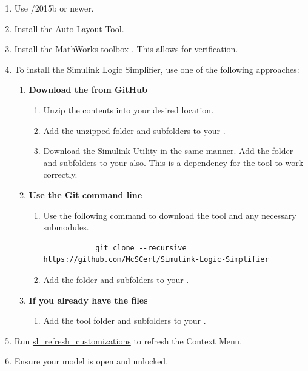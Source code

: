 \documentclass{article}
\makeatletter
\newcommand{\ToolName}{Simulink Logic Simplifier\@\xspace}
\makeatother
\begin{document}
\begin{enumerate}
	\item Use \Matlab/\Simulink 2015b or newer.
	\item Install the \href{https://github.com/McSCert/Auto-Layout}{Auto Layout Tool}.
	\item Install the MathWorks toolbox \href{https://www.mathworks.com/products/sldesignverifier.html}{\SDV}. This allows for verification.
	\item To install the \ToolName, use one of the following approaches:
	\begin{enumerate}
		\item \textbf{Download the  from GitHub}
		\begin{enumerate} 
			\item Unzip the contents into your desired location. 
			\item Add the unzipped folder and subfolders to your \mpath. 
			\item Download the \href{https://github.com/McSCert/Simulink-Utility}{Simulink-Utility} in the same manner. Add the folder and subfolders to your \mpath also. This is a dependency for the tool to work correctly.
		\end{enumerate}
		\item \textbf{Use the Git command line}
		\begin{enumerate}
			\item Use the following command to download the tool and any necessary submodules. 
			\begin{verbatim}
			git clone --recursive https://github.com/McSCert/Simulink-Logic-Simplifier
			\end{verbatim}
			\item Add the folder and subfolders to your \mpath. 
		\end{enumerate}
		\item \textbf{If you already have the files}
		\begin{enumerate}
			\item Add the tool folder and subfolders to your \mpath. 
		\end{enumerate}
\end{enumerate}
	\item Run \href{https://www.mathworks.com/help/simulink/ug/registering-customizations.html}{sl\_refresh\_customizations} to refresh the Context Menu. 
	\item Ensure your model is open and unlocked.
\end{enumerate}
\end{document}
